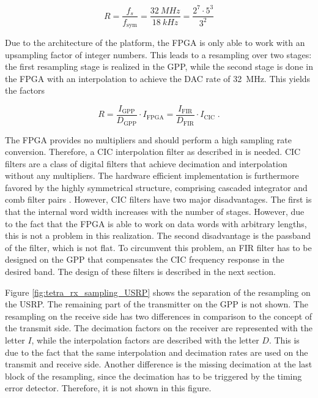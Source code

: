 \begin{equation}
	R = \frac{f_s}{f_\text{sym}}=\frac{\SI{32}{MHz}}{\SI{18}{kHz}} = \frac{2^7\cdot 5^3}{3^2}
\label{eq:res_usrp}
\end{equation}

Due to the architecture of the platform, the FPGA is only able to work with an upsampling factor of integer numbers. This leads to a resampling over two stages: the first resampling stage is realized in the GPP, while the second stage is done in the FPGA with an interpolation to achieve the DAC rate of \SI{32}{MHz}. This yields the factors

\begin{equation}
	R = \frac{I_\text{GPP}}{D_\text{GPP}}\cdot I_\text{FPGA} = \frac{I_\text{FIR}}{D_\text{FIR}}\cdot I_\text{CIC}\;.
\label{eq:r}
\end{equation}

The FPGA provides no multipliers and should perform a high sampling rate conversion. Therefore, a \ac{CIC} interpolation filter as described in \cite{hogenauer} is needed. CIC filters are a class of digital filters that achieve decimation and interpolation without any multipliers. The hardware efficient implementation is furthermore favored by the highly symmetrical structure, comprising cascaded integrator and comb filter pairs \cite{cic_comp}. However, CIC filters have two major disadvantages. The first is that the internal word width increases with the number of stages. However, due to the fact that the FPGA is able to work on data words with arbitrary lengths, this is not a problem in this realization. The second disadvantage is the passband of the filter, which is not flat. To circumvent this problem, an \ac{FIR} filter has to be designed on the GPP that compensates the CIC frequency response in the desired band. The design of these filters is described in the next section.

Figure \ref{fig:tetra_rx_sampling_USRP} shows the separation of the resampling on the USRP. The remaining part of the transmitter on the GPP is not shown. The resampling on the receive side has two differences in comparison to the concept of the transmit side. The decimation factors on the receiver are represented with the letter $I$, while the interpolation factors are described with the letter $D$. This is due to the fact that the same interpolation and decimation rates are used on the transmit and receive side. Another difference is the missing decimation at the last block of the resampling, since the decimation has to be triggered by the timing error detector. Therefore, it is not shown in this figure. 

